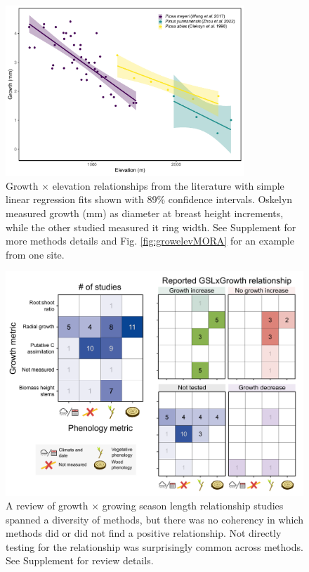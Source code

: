 \documentclass[11pt]{article}
\begin{document}
\begin{figure}[h!]
\includegraphics[width=0.8\textwidth]{..//analyses/growthxelevationetc/figures/growthbyelevation_plot.pdf} %
\caption{Growth $\times$ elevation relationships from the literature with simple linear regression fits shown with 89\% confidence intervals. Oskelyn measured growth (mm) as diameter at breast height increments, while the other studied measured it ring width. See Supplement for more methods details and Fig. \ref{fig:growelevMORA} for an example from one site.}
\label{fig:gxelev}
\end{figure}

\clearpage
\begin{figure}[h!]
\includegraphics[width=1\textwidth]{..//figures/_figuresFromRuben/heatmap.png} %
\caption{A review of growth $\times$ growing season length relationship studies spanned a diversity of methods, but there was no coherency in which methods did or did not find a positive relationship. Not directly testing for the relationship was surprisingly common across methods. See Supplement for review details.}
\label{fig:heatmaps}
\end{figure}
\end{document}

